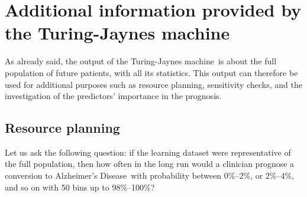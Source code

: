 \documentclass[utf8]{FrontiersinHarvard} %
\renewcommand*{\|}[1][]{\nonscript\:#1\vert\nonscript\:\mathopen{}}
\newcommand*{\ad}{Alzheimer's Disease}
\newcommand*{\tjm}{Turing-Jaynes machine}
\begin{document}
 




\bigskip
\section{Additional information provided by the \tjm}
\label{sec:additional_results}

As already said, the output of the \tjm\ is about the full population of future patients, with all its statistics. This output can therefore be used for additional purposes such as resource planning, sensitivity checks, and the investigation of the predictors' importance in the prognosis.

\subsection{Resource planning}
\label{sec:resource_planning}

Let us ask the following question: if the learning dataset were representative of the full population, then how often in the long run would a clinician prognose a conversion to \ad\ with probability between 0\%--2\%, or 2\%--4\%, and so on with 50 bins up to 98\%--100\%?
\end{document}
